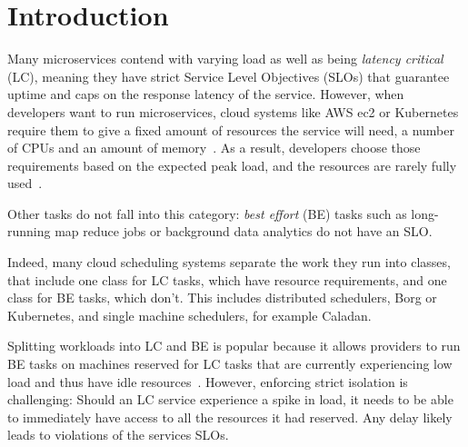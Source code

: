 \section{Introduction}
\label{s:intro}

Many microservices contend with varying load as well as being \textit{latency
critical} (LC), meaning they have strict Service Level Objectives (SLOs) that
guarantee uptime and caps on the response latency of the service. However, when
developers want to run microservices, cloud systems like AWS ec2 or Kubernetes
require them to give a fixed amount of resources the service will need, \ie{} a
number of CPUs and an amount of memory~\cite{aws-ec2-resources,
kubernetes-resources}. As a result, developers choose those requirements based
on the expected peak load, and the resources are rarely fully used~\cite{borg,
nu, overprovision}.

Other tasks do not fall into this category: \textit{best effort} (BE) tasks such
as long-running map reduce jobs or background data analytics do not have an SLO.

Indeed, many cloud scheduling systems separate the work they run into classes,
that include one class for LC tasks, which have resource requirements, and one
class for BE tasks, which don't. This includes distributed schedulers, \eg{}
Borg\cite{borg} or Kubernetes\cite{kubernetes-resources}, and single machine
schedulers, for example Caladan\cite{caladan}.

Splitting workloads into LC and BE is popular because it allows providers to run
BE tasks on machines reserved for LC tasks that are currently experiencing low
load and thus have idle resources~\cite{perfiso}. However, enforcing strict
isolation is challenging: Should an LC service experience a spike in load, it
needs to be able to immediately have access to all the resources it had
reserved. Any delay likely leads to violations of the services SLOs.

